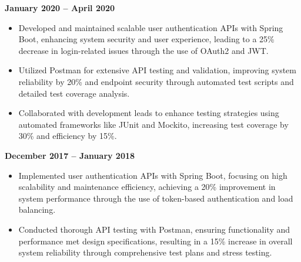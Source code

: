 \documentclass{article}
\begin{document}
 \hfill \textbf{January 2020 – April 2020}
\begin{itemize}[noitemsep,nolistsep,leftmargin=*]
    \item Developed and maintained scalable user authentication APIs with Spring Boot, enhancing system security and user experience, leading to a 25\% decrease in login-related issues through the use of OAuth2 and JWT.
    \item Utilized Postman for extensive API testing and validation, improving system reliability by 20\% and endpoint security through automated test scripts and detailed test coverage analysis.
    \item Collaborated with development leads to enhance testing strategies using automated frameworks like JUnit and Mockito, increasing test coverage by 30\% and efficiency by 15\%.
\end{itemize}

 \hfill \textbf{December 2017 – January 2018}
\begin{itemize}[noitemsep,nolistsep,leftmargin=*]
    \item Implemented user authentication APIs with Spring Boot, focusing on high scalability and maintenance efficiency, achieving a 20\% improvement in system performance through the use of token-based authentication and load balancing.
    \item Conducted thorough API testing with Postman, ensuring functionality and performance met design specifications, resulting in a 15\% increase in overall system reliability through comprehensive test plans and stress testing.
\end{itemize}
\end{document}
